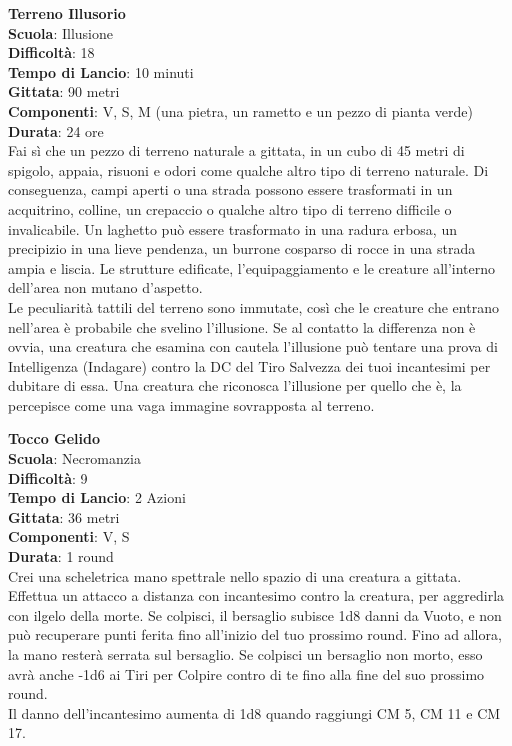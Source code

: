 \begin{multicols}{2}
\medskip\textbf{Terreno Illusorio}\\
\textbf{Scuola}: Illusione\\
\textbf{Difficoltà}:  18\\
\textbf{Tempo di Lancio}: 10 minuti\\
\textbf{Gittata}: 90 metri\\
\textbf{Componenti}: V, S, M (una pietra, un rametto e un pezzo di pianta verde)\\
\textbf{Durata}: 24 ore \\
Fai sì che un pezzo di terreno naturale a gittata, in un cubo di 45 metri di spigolo, appaia, risuoni e odori come qualche altro tipo di terreno naturale. Di conseguenza, campi aperti o una strada possono essere trasformati in un acquitrino, colline, un crepaccio o qualche altro tipo di terreno difficile o invalicabile. Un laghetto può essere trasformato in una radura erbosa, un precipizio in una lieve pendenza, un burrone cosparso di rocce in una strada ampia e liscia. Le strutture edificate, l’equipaggiamento e le creature all'interno dell'area non mutano d’aspetto.\\
Le peculiarità tattili del terreno sono immutate, così che le creature che entrano nell'area è probabile che svelino l’illusione. Se al contatto la differenza non è ovvia, una creatura che esamina con cautela l’illusione può tentare una prova di Intelligenza (Indagare) contro la DC del Tiro Salvezza dei tuoi incantesimi per dubitare di essa. Una creatura che riconosca l’illusione per quello che è, la percepisce come una vaga immagine sovrapposta al terreno.

\medskip\textbf{Tocco Gelido}\\
\textbf{Scuola}: Necromanzia\\
\textbf{Difficoltà}:  9\\
\textbf{Tempo di Lancio}: 2 Azioni\\
\textbf{Gittata}: 36 metri\\
\textbf{Componenti}: V, S\\
\textbf{Durata}: 1 round\\
Crei una scheletrica mano spettrale nello spazio di una creatura a gittata. Effettua un attacco a distanza con incantesimo contro la creatura, per aggredirla con ilgelo della morte. Se colpisci, il  bersaglio subisce 1d8 danni da Vuoto, e non può recuperare punti ferita fino all'inizio del tuo prossimo round. Fino ad allora, la mano resterà serrata sul bersaglio. Se colpisci un bersaglio non morto, esso avrà anche -1d6 ai Tiri per Colpire contro di te fino alla fine del suo prossimo round.\\
Il danno dell'incantesimo aumenta di 1d8 quando raggiungi CM 5, CM 11 e CM 17.


\end{multicols}
